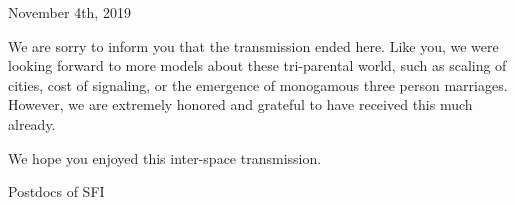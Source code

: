 
November 4th, 2019

We are sorry to inform you that the transmission ended here. Like you, we were looking forward to more models about these tri-parental world, such as scaling of cities, cost of signaling, or the emergence of monogamous three person marriages. However, we are extremely honored and grateful to have received this much already. 

We hope you enjoyed this inter-space transmission. 

Postdocs of SFI 
